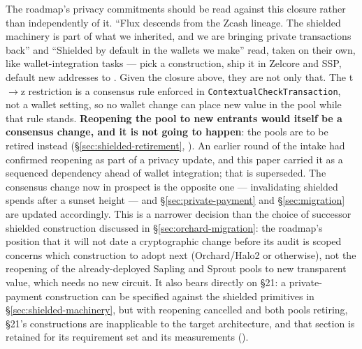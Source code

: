 The roadmap's privacy commitments should be read against this closure rather than independently of
it. ``Flux descends from the Zcash lineage. The shielded machinery is part of what we inherited, and
we are bringing private transactions back''  and ``Shielded by
default in the wallets we make''  read, taken on their own, like
wallet-integration tasks — pick a construction, ship it in Zelcore and SSP, default new addresses to
\zaddr. Given the closure above, they are not only that. The t$\to$z restriction is a consensus rule
enforced in \texttt{Contextual\allowbreak{}Check\allowbreak{}Transaction}, not a wallet setting, so no wallet change can place
new value in the pool while that rule stands. \textbf{Reopening the pool to new entrants would itself be a
consensus change, and it is not going to happen}: the pools are to be retired instead
(\S\ref{sec:shielded-retirement}, ). An earlier round of
the intake had confirmed reopening as part of a privacy update, and this paper carried it as a
sequenced dependency ahead of wallet integration; that is superseded. The consensus change now in
prospect is the opposite one --- invalidating shielded spends after a sunset height --- and
\S\ref{sec:private-payment} and \S\ref{sec:migration} are updated accordingly. This is a narrower
decision than the choice of successor shielded construction discussed in
\S\ref{sec:orchard-migration}: the roadmap's position that it will not date a cryptographic change
before its audit is scoped concerns which construction to adopt next (Orchard/Halo2 or otherwise), not
the reopening of the already-deployed Sapling and Sprout pools to new transparent value, which needs no
new circuit. It also bears directly on \S21: a private-payment construction can be specified against
the shielded primitives in \S\ref{sec:shielded-machinery}, but with reopening cancelled and both pools
retiring, \S21's constructions are inapplicable to the target architecture, and that section is
retained for its requirement set and its measurements ().

